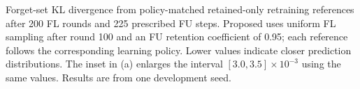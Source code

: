 \caption{Forget-set KL divergence from policy-matched retained-only retraining references after 200 FL rounds and 225 prescribed FU steps. Proposed uses uniform FL sampling after round 100 and an FU retention coefficient of 0.95; each reference follows the corresponding learning policy. Lower values indicate closer prediction distributions. The inset in (a) enlarges the interval $[3.0,3.5]\times10^{-3}$ using the same values. Results are from one development seed.}

